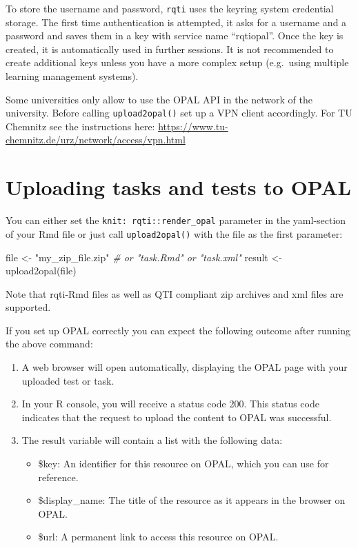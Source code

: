 \documentclass[twoside]{tufte-book}
\newenvironment{Shaded}{}{}
\newcommand{\CommentTok}[1]{\textcolor[rgb]{0.38,0.63,0.69}{\textit{#1}}}
\newcommand{\FunctionTok}[1]{\textcolor[rgb]{0.02,0.16,0.49}{#1}}
\newcommand{\NormalTok}[1]{#1}
\newcommand{\OtherTok}[1]{\textcolor[rgb]{0.00,0.44,0.13}{#1}}
\newcommand{\StringTok}[1]{\textcolor[rgb]{0.25,0.44,0.63}{#1}}
\providecommand{\tightlist}{%
  \setlength{\itemsep}{0pt}\setlength{\parskip}{0pt}}
\begin{document}
To store the username and password, \texttt{rqti} uses the keyring system credential storage. The first time authentication is attempted, it asks for a username and a password and saves them in a key with service name ``rqtiopal''. Once the key is created, it is automatically used in further sessions. It is not recommended to create additional keys unless you have a more complex setup (e.g.~using multiple learning management systems).

Some universities only allow to use the OPAL API in the network of the university. Before calling \texttt{upload2opal()} set up a VPN client accordingly.
For TU Chemnitz see the instructions here: \url{https://www.tu-chemnitz.de/urz/network/access/vpn.html}

\section{Uploading tasks and tests to OPAL}\label{uploading-tasks-and-tests-to-opal}

You can either set the \texttt{knit:\ rqti::render\_opal} parameter in the yaml-section of your Rmd file or just call \texttt{upload2opal()} with the file as the first parameter:

\begin{Shaded}
\begin{Highlighting}[]
\NormalTok{file }\OtherTok{\textless{}{-}} \StringTok{"my\_zip\_file.zip"} \CommentTok{\# or "task.Rmd" or "task.xml"}
\NormalTok{result }\OtherTok{\textless{}{-}} \FunctionTok{upload2opal}\NormalTok{(file)}
\end{Highlighting}
\end{Shaded}

Note that rqti-Rmd files as well as QTI compliant zip archives and xml files are supported.

If you set up OPAL correctly you can expect the following outcome after running the above command:

\begin{enumerate}
\def\labelenumi{\arabic{enumi}.}
\tightlist
\item
  A web browser will open automatically, displaying the OPAL page with your uploaded test or task.
\item
  In your R console, you will receive a status code 200. This status code indicates that the request to upload the content to OPAL was successful.
\item
  The result variable will contain a list with the following data:

  \begin{itemize}
  \tightlist
  \item
    \$key: An identifier for this resource on OPAL, which you can use for reference.
  \item
    \$display\_name: The title of the resource as it appears in the browser on OPAL.
  \item
    \$url: A permanent link to access this resource on OPAL.
  \end{itemize}
\end{enumerate}
\end{document}
